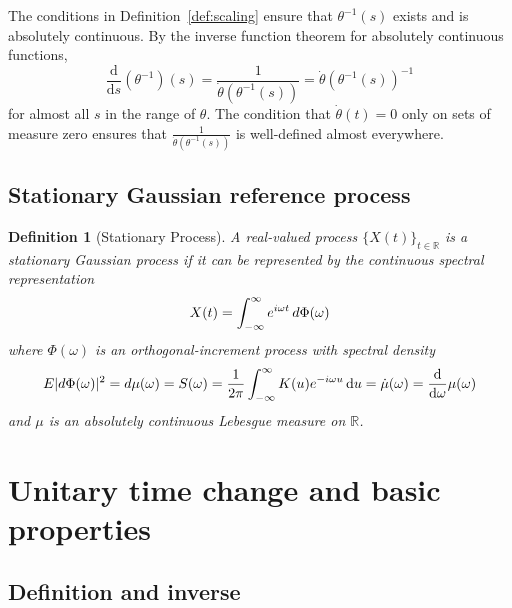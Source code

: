 \documentclass{article}
\newtheorem{definition}{Definition}
\begin{document}
\begin{remark}
  \label{rem:inverse_properties}The conditions in Definition~\ref{def:scaling}
  ensure that $\theta^{- 1} (s)$ exists and is absolutely continuous. By the
  inverse function theorem for absolutely continuous functions,
  \begin{equation}
    \frac{\mathrm{d}}{\mathrm{d} s} (\theta^{- 1}) (s) = \frac{1}{\dot{\theta}
    (\theta^{- 1} (s))} = \dot{\theta} (\theta^{- 1} (s))^{- 1}
  \end{equation}
  for almost all $s$ in the range of $\theta$. The condition that
  $\dot{\theta} (t) = 0$ only on sets of measure zero ensures that
  $\frac{1}{\dot{\theta} (\theta^{- 1} (s))}$ is well-defined almost
  everywhere.
\end{remark}

\subsection{Stationary Gaussian reference process}\label{sec:stationary}

\begin{definition}[Stationary Process]
  A real-valued process $\{X (t)\}_{t \in \mathbb{R}}$ is a stationary
  Gaussian process if it can be represented by the continuous spectral
  representation
  \begin{equation}
    \label{eq:stationary_rep} X (t) = \int_{- \infty}^{\infty} e^{i \omega t} 
    \hspace{0.17em} d \Phi (\omega)
  \end{equation}
  where $\Phi (\omega)$ is an orthogonal-increment process with spectral
  density
  \begin{equation}
    E \lvert d \Phi (\omega) \rvert^2 = d \mu (\omega) = S (\omega) =
    \frac{1}{2 \pi}  \int_{- \infty}^{\infty} K (u) e^{- i \omega u}
    \hspace{0.17em} \mathrm{d} u = \dot{\mu} (\omega) =
    \frac{\mathrm{d}}{\mathrm{d} \omega} \mu (\omega)
  \end{equation}
  and $\mu$ is an absolutely continuous Lebesgue measure on $\mathbb{R}$.
\end{definition}

\section{Unitary time change and basic properties}\label{sec:time_change}

\subsection{Definition and inverse}
\end{document}
